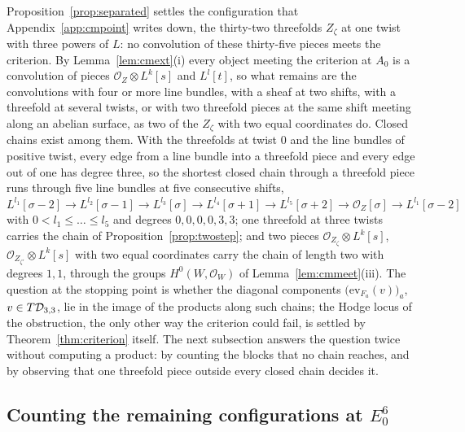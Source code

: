 Proposition~\ref{prop:separated} settles the configuration that Appendix~\ref{app:cmpoint} writes down, the thirty-two threefolds $Z_{\zeta}$ at one twist with three powers of $L$: no convolution of these thirty-five pieces meets the criterion. By Lemma~\ref{lem:cmext}(i) every object meeting the criterion at $A_{0}$ is a convolution of pieces $\mathcal{O}_{Z}\otimes L^{k}[s]$ and $L^{l}[t]$, so what remains are the convolutions with four or more line bundles, with a sheaf at two shifts, with a threefold at several twists, or with two threefold pieces at the same shift meeting along an abelian surface, as two of the $Z_{\zeta}$ with two equal coordinates do. Closed chains exist among them. With the threefolds at twist $0$ and the line bundles of positive twist, every edge from a line bundle into a threefold piece and every edge out of one has degree three, so the shortest closed chain through a threefold piece runs through five line bundles at five consecutive shifts, $L^{l_{1}}[\sigma-2]\to L^{l_{2}}[\sigma-1]\to L^{l_{3}}[\sigma]\to L^{l_{4}}[\sigma+1]\to L^{l_{5}}[\sigma+2]\to\mathcal{O}_{Z}[\sigma]\to L^{l_{1}}[\sigma-2]$ with $0<l_{1}\le\dots\le l_{5}$ and degrees $0,0,0,0,3,3$; one threefold at three twists carries the chain of Proposition~\ref{prop:twostep}; and two pieces $\mathcal{O}_{Z_{\zeta}}\otimes L^{k}[s]$, $\mathcal{O}_{Z_{\zeta'}}\otimes L^{k}[s]$ with two equal coordinates carry the chain of length two with degrees $1,1$, through the groups $H^{0}(W,\mathcal{O}_{W})$ of Lemma~\ref{lem:cmmeet}(iii). The question at the stopping point is whether the diagonal components $\bigl(\mathrm{ev}_{F_{a}}(v)\bigr)_{a}$, $v\in T\mathcal{D}_{3,3}$, lie in the image of the products along such chains; the Hodge locus of the obstruction, the only other way the criterion could fail, is settled by Theorem~\ref{thm:criterion} itself. The next subsection answers the question twice without computing a product: by counting the blocks that no chain reaches, and by observing that one threefold piece outside every closed chain decides it.

\subsection{Counting the remaining configurations at $E_{0}^{6}$}\label{ssec:e06count}

